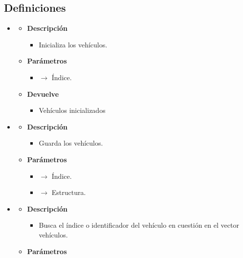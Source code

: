 \subsection{Definiciones}
\begin{itemize}
	\item {}
	\begin{itemize}
		\item \textbf{Descripción}
        \begin{itemize}
			\item Inicializa los vehículos.
		\end{itemize}
        \item \textbf{Parámetros}
		\begin{itemize}
			\item {} $\rightarrow$ Índice.
		\end{itemize}
		\item \textbf{Devuelve}
		\begin{itemize}
			\item Vehículos inicializados
		\end{itemize}
	\end{itemize}
	\item{}
	\begin{itemize}
		\item \textbf{Descripción}
        \begin{itemize}
			\item Guarda los vehículos.
		\end{itemize}
        \item \textbf{Parámetros}
		\begin{itemize}
			\item {} $\rightarrow$ Índice.
            \item {} $\rightarrow$ Estructura.
		\end{itemize}
	\end{itemize}
    \item{}
	\begin{itemize}
		\item \textbf{Descripción}
        \begin{itemize}
			\item Busca el índice o identificador del vehículo en cuestión en el vector vehículos.
		\end{itemize}
        \item \textbf{Parámetros}

\end{itemize}
\end{itemize}
